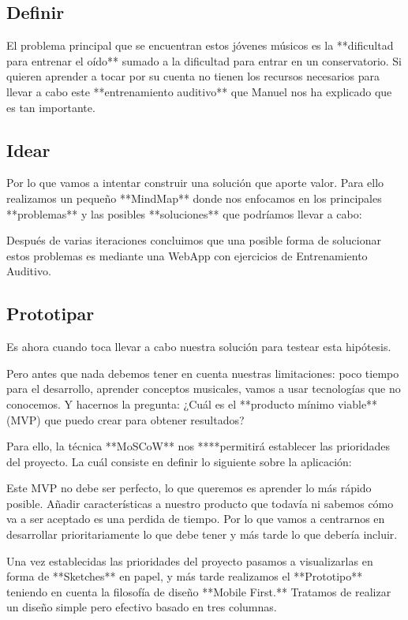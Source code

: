\documentclass[12pt,twoside,titlepage]{report}
\begin{document}
{\subsection{Definir}

El problema principal que se encuentran estos jóvenes músicos es la **dificultad para entrenar el oído** sumado a la dificultad para entrar en un conservatorio. Si quieren aprender a tocar por su cuenta no tienen los recursos necesarios para llevar a cabo este **entrenamiento auditivo** que Manuel nos ha explicado que es tan importante.

\subsection{Idear}

Por lo que vamos a intentar construir una solución que aporte valor. Para ello realizamos un pequeño **MindMap** donde nos enfocamos en los principales **problemas** y las posibles **soluciones** que podríamos llevar a cabo:

Después de varias iteraciones concluimos que una posible forma de solucionar estos problemas es mediante una WebApp con ejercicios de Entrenamiento Auditivo. 

\subsection{Prototipar}

Es ahora cuando toca llevar a cabo nuestra solución para testear esta hipótesis. 

Pero antes que nada debemos tener en cuenta nuestras limitaciones: poco tiempo para el desarrollo, aprender conceptos musicales, vamos a usar tecnologías que no conocemos. Y hacernos la pregunta: ¿Cuál es el **producto mínimo viable** (MVP) que puedo crear para obtener resultados?

Para ello, la técnica **MoSCoW** nos ****permitirá establecer las prioridades del proyecto. La cuál consiste en definir lo siguiente sobre la aplicación:

Este MVP no debe ser perfecto, lo que queremos es aprender lo más rápido posible. Añadir características a nuestro producto que todavía ni sabemos cómo va a ser aceptado es una perdida de tiempo. Por lo que vamos a centrarnos en desarrollar prioritariamente lo que debe tener y más tarde lo que debería incluir.

Una vez establecidas las prioridades del proyecto pasamos a visualizarlas en forma de **Sketches** en papel, y más tarde realizamos el **Prototipo** teniendo en cuenta la filosofía de diseño **Mobile First.** Tratamos de realizar un diseño simple pero efectivo basado en tres columnas.

}
\end{document}
